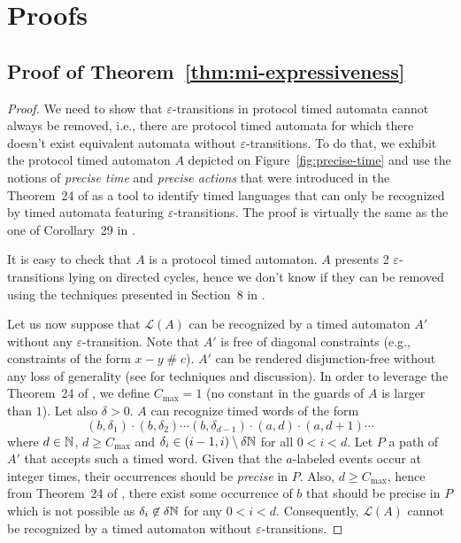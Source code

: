 
\chapter{Proofs}
\label{chap:proofs}


\section{Proof of Theorem~\ref{thm:mi-expressiveness}}
\label{proof:mi-expressiveness}


\begin{proof}
%
We need to show that $\varepsilon$-transitions in protocol timed automata cannot always be removed, i.e., there are protocol timed automata for which there doesn't exist equivalent automata without $\varepsilon$-transitions. To do that, we exhibit the protocol timed automaton $A$ depicted on Figure~\ref{fig:precise-time} and use the notions of \emph{precise time} and \emph{precise actions} that were introduced in the Theorem~24 of \cite{BBVD+99} as a tool to identify timed languages that can only be recognized by timed automata featuring $\varepsilon$-transitions. The proof is virtually the same as the one of Corollary~29 in \cite{BBVD+99}.

It is easy to check that $A$ is a protocol timed automaton. $A$ presents 2 $\varepsilon$-transitions lying on directed cycles, hence we don't know if they can be removed using the techniques presented in Section~8 in \cite{BBVD+99}.

Let us now suppose that $\mathcal{L}(A)$ can be recognized by a timed automaton $A'$ without any $\varepsilon$-transition. Note that $A'$ is free of diagonal constraints (e.g., constraints of the form $x - y \;\#\; c$). $A'$ can be rendered disjunction-free without any loss of generality (see \cite{BBVD+99} for techniques and discussion). In order to leverage the Theorem~24 of \cite{BBVD+99}, we define $C_{\mbox{max}} = 1$ (no constant in the guards of $A$ is larger than $1$). Let also $\delta > 0$. $A$ can recognize timed words of the form
$$
  (b, \delta_1) \cdot (b, \delta_2) \cdots (b, \delta_{d - 1}) \cdot (a, d) \cdot (a, d + 1) \cdots
$$
where $d \in \mathbb{N}$, $d \geq C_{\mbox{max}}$ and $\delta_i \in (i-1, i) \setminus \delta \mathbb{N}$ for all $0 < i < d$. Let $P$ a path of $A'$ that accepts such a timed word. Given that the $a$-labeled events occur at integer times, their occurrences should be \emph{precise} in $P$. Also, $d \geq C_{\mbox{max}}$, hence from Theorem~24 of \cite{BBVD+99}, there exist some occurrence of $b$ that should be precise in $P$ which is not possible as $\delta_i \not\in \delta \mathbb{N}$ for any $0 < i < d$. Consequently,  $\mathcal{L}(A)$ cannot be recognized by a timed automaton without $\varepsilon$-transitions.
%
\end{proof}

